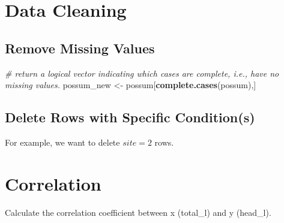 \documentclass[
]{book}
\newenvironment{Shaded}{\begin{snugshade}}{\end{snugshade}}
\newcommand{\CommentTok}[1]{\textcolor[rgb]{0.56,0.35,0.01}{\textit{#1}}}
\newcommand{\DecValTok}[1]{\textcolor[rgb]{0.00,0.00,0.81}{#1}}
\newcommand{\KeywordTok}[1]{\textcolor[rgb]{0.13,0.29,0.53}{\textbf{#1}}}
\newcommand{\NormalTok}[1]{#1}
\newcommand{\OperatorTok}[1]{\textcolor[rgb]{0.81,0.36,0.00}{\textbf{#1}}}
\newcommand{\StringTok}[1]{\textcolor[rgb]{0.31,0.60,0.02}{#1}}
\begin{document}
\hypertarget{data-cleaning}{%
\section{Data Cleaning}\label{data-cleaning}}

\hypertarget{remove-missing-values}{%
\subsection{Remove Missing Values}\label{remove-missing-values}}

\begin{Shaded}
\begin{Highlighting}[]
\CommentTok{# return a logical vector indicating which cases are complete, i.e., have no missing values.}
\NormalTok{possum_new <-}\StringTok{ }\NormalTok{possum[}\KeywordTok{complete.cases}\NormalTok{(possum),]}
\end{Highlighting}
\end{Shaded}

\hypertarget{delete-rows-with-specific-conditions}{%
\subsection{Delete Rows with Specific Condition(s)}\label{delete-rows-with-specific-conditions}}

For example, we want to delete \(site = 2\) rows.

\begin{Shaded}
\end{Shaded}

\hypertarget{correlation}{%
\section{Correlation}\label{correlation}}

Calculate the correlation coefficient between x (total\_l) and y (head\_l).

\begin{Shaded}
\end{Shaded}
\end{document}
